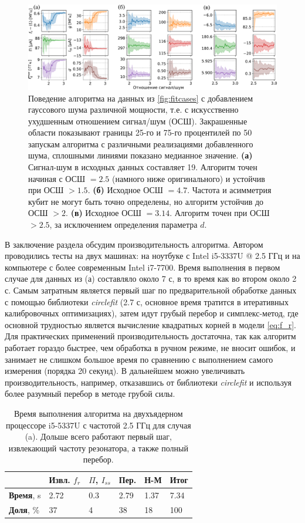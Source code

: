 \documentclass[14pt, a4paper]{extreport}
\numberwithin{equation}{section}
\begin{document}
\begin{figure}
	\includegraphics[width=1\linewidth]{Pictures/noise_test}
	\caption{Поведение алгоритма на данных из \autoref{fig:fitcases} с добавлением гауссового шума различной мощности, т.е. с искусственно ухудшенным отношением сигнал/шум (ОСШ). Закрашенные области показывают границы 25-го и 75-го процентилей по 50 запускам алгоритма с различными реализациями добавленного шума, сплошными линиями показано медианное значение. \textbf{(а)} Сигнал-шум в исходных данных составляет 19. Алгоритм точен начиная с ОСШ $=2.5$ (намного ниже оригинального) и устойчив при ОСШ $>1.5$. \textbf{(б)} Исходное ОСШ $=4.7$. Частота и асимметрия кубит не могут быть точно определены, но алгоритм устойчив до ОСШ $>2$. \textbf{(в)} Исходное ОСШ $=3.14$. Алгоритм точен при ОСШ $>2.5$, за исключением определения параметра $d$.}
	\label{fig:noisetest}
\end{figure}

 
В заключение раздела обсудим производительность алгоритма. Автором проводились тесты на двух машинах: на ноутбуке с Intel i5-3337U @ 2.5 ГГц и на компьютере с более современным Intel i7-7700. Время выполнения в первом случае для данных из (а) составляло около 7 с, в то время как во втором около 2 с. Самым затратным является первый шаг по предварительной обработке данных с помощью библиотеки \foreignlanguage{english}{\textit{circlefit}} (2.7 с, основное время тратится в итеративных калибровочных оптимизациях), затем идут грубый перебор и симплекс-метод, где основной трудностью является вычисление квадратных корней в модели \eqref{eq:f_r}. Для практических применений производительность достаточна, так как алгоритм работает гораздо быстрее, чем обработка в ручном режиме, не вносит ошибок, и занимает не слишком большое время по сравнению с выполнением самого измерения (порядка 20 секунд). В дальнейшем можно увеличивать производительность, например, отказавшись от библиотеки \foreignlanguage{english}{\textit{circlefit}} и используя более разумный перебор в методе грубой силы.

\begin{table}
	\centering
	\small{
		\begin{tabular}{llllll}\toprule
			&Извл. $f_r$& $\Pi$, $I_{ss}$ & Пер. &Н-М &
			\textbf{Итог}\\\midrule
			\textbf{Время}, s& 2.72& 0.3&2.79&1.37&7.34\\
			\textbf{Доля}, \% & 37 &4 &38 &18 &100\\
			\bottomrule
	\end{tabular}}
 \caption{Время выполнения алгоритма на двухъядерном процессоре i5-5337U с частотой 2.5 ГГц для случая (a). Дольше всего работают первый шаг, извлекающий частоту резонатора, а также полный перебор.}
 \label{tab:performance}
\end{table}
\end{document}
